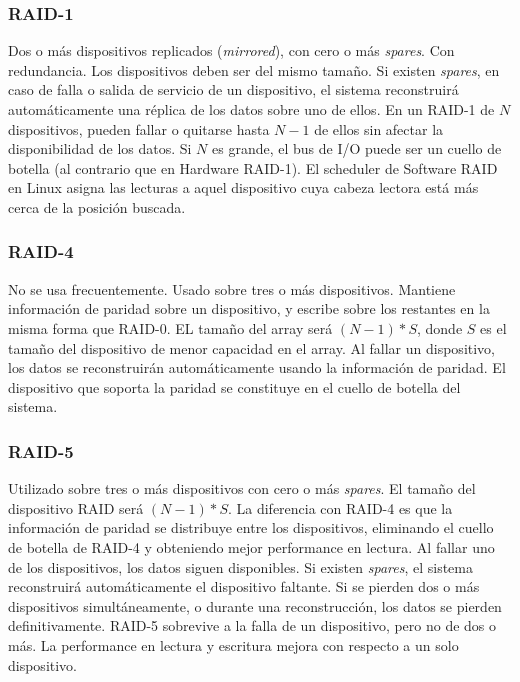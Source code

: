 \subsubsection{RAID-1}
\label{ssub:RAID-1}

Dos o más dispositivos replicados (\emph{mirrored}), con cero o más \emph{spares}. 
Con redundancia. Los dispositivos deben ser del mismo tamaño. Si existen \emph{spares}, en caso de falla o salida de servicio de un dispositivo, el sistema reconstruirá automáticamente una réplica de los datos sobre uno de ellos. 
En un RAID-1 de $N$ dispositivos, pueden fallar o quitarse hasta $N-1$ de ellos sin afectar la disponibilidad de los datos. 
Si $N$ es grande, el bus de I/O puede ser un cuello de botella (al contrario que en Hardware RAID-1). El scheduler de Software RAID en Linux asigna las lecturas a aquel dispositivo cuya cabeza lectora está más cerca de la posición buscada. 


\subsubsection{RAID-4}
\label{ssub:RAID-4}
No se usa frecuentemente. Usado sobre tres o más dispositivos. Mantiene información de paridad sobre un dispositivo, y escribe sobre los restantes en la misma forma que RAID-0. EL tamaño del array será $(N-1)*S$, donde $S$ es el tamaño del dispositivo de menor capacidad en el array. 
Al fallar un dispositivo, los datos se reconstruirán automáticamente usando la información de paridad. El dispositivo que soporta la paridad se constituye en el cuello de botella del sistema. 


\subsubsection{RAID-5}
\label{ssub:RAID-5}
Utilizado sobre tres o más dispositivos con cero o más \emph{spares}. El tamaño del dispositivo RAID será $(N-1)*S$. La diferencia con RAID-4 es que la información de paridad se distribuye entre los dispositivos, eliminando el cuello de botella de RAID-4 y obteniendo mejor performance en lectura. Al fallar uno de los dispositivos, los datos siguen disponibles. Si existen \emph{spares}, el sistema reconstruirá automáticamente el dispositivo faltante. Si se pierden dos o más dispositivos simultáneamente, o durante una reconstrucción, los datos se pierden definitivamente. RAID-5 sobrevive a la falla de un dispositivo, pero no de dos o más. 
La performance en lectura y escritura mejora con respecto a un solo dispositivo. 


